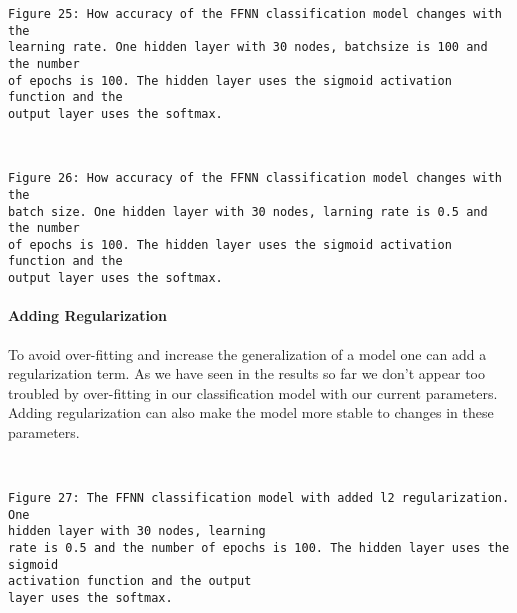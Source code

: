 \documentclass[11pt]{article}
\begin{document}
    \begin{Verbatim}[commandchars=\\\{\}]
Figure 25: How accuracy of the FFNN classification model changes with the
learning rate. One hidden layer with 30 nodes, batchsize is 100 and the number
of epochs is 100. The hidden layer uses the sigmoid activation function and the
output layer uses the softmax.
    \end{Verbatim}


    \begin{center}
    \end{center}
    { \hspace*{\fill} \\}
    
    \begin{Verbatim}[commandchars=\\\{\}]
Figure 26: How accuracy of the FFNN classification model changes with the
batch size. One hidden layer with 30 nodes, larning rate is 0.5 and the number
of epochs is 100. The hidden layer uses the sigmoid activation function and the
output layer uses the softmax.
    \end{Verbatim}

    \hypertarget{adding-regularization}{%
\paragraph{Adding Regularization}\label{adding-regularization}}

To avoid over-fitting and increase the generalization of a model one can
add a regularization term. As we have seen in the results so far we
don't appear too troubled by over-fitting in our classification model
with our current parameters. Adding regularization can also make the
model more stable to changes in these parameters.

    \begin{center}
    \end{center}
    { \hspace*{\fill} \\}
    
    \begin{Verbatim}[commandchars=\\\{\}]
Figure 27: The FFNN classification model with added l2 regularization. One
hidden layer with 30 nodes, learning
rate is 0.5 and the number of epochs is 100. The hidden layer uses the sigmoid
activation function and the output
layer uses the softmax.
    \end{Verbatim}
\end{document}
